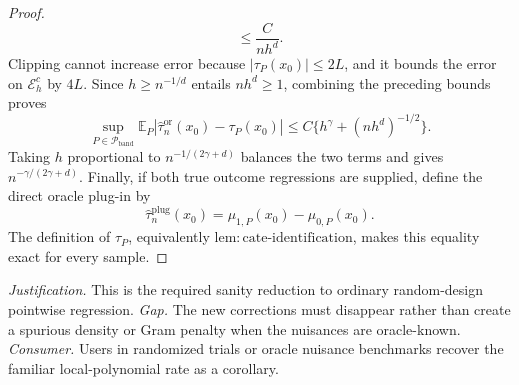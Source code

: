 \documentclass{article}
\begin{document}
\begin{proof}
\[ \le\frac{C}{nh^d}.
\]
Clipping cannot increase error because \(|\tau_P(x_0)|\le2L\), and it bounds the error on \(\mathcal E_h^c\) by \(4L\).  Since \(h\ge n^{-1/d}\) entails \(nh^d\ge1\), combining the preceding bounds proves
\[
 \sup_{P\in\mathcal P_{\mathrm{band}}}
 \mathbb E_P|\widehat\tau_n^{\mathrm{or}}(x_0)-\tau_P(x_0)|
 \le C\{h^\gamma+(nh^d)^{-1/2}\}.
\]
Taking \(h\) proportional to \(n^{-1/(2\gamma+d)}\) balances the two terms and gives \(n^{-\gamma/(2\gamma+d)}\).  Finally, if both true outcome regressions are supplied, define the direct oracle plug-in by
\[
 \widehat\tau_n^{\mathrm{plug}}(x_0)
 =\mu_{1,P}(x_0)-\mu_{0,P}(x_0).
\]
The definition of \(\tau_P\), equivalently \(\mathrm{lem:cate\mbox{-}identification}\), makes this equality exact for every sample.
\end{proof}
\par\smallskip\noindent \textit{Justification.} This is the required sanity reduction to ordinary random-design pointwise regression. \textit{Gap.} The new corrections must disappear rather than create a spurious density or Gram penalty when the nuisances are oracle-known. \textit{Consumer.} Users in randomized trials or oracle nuisance benchmarks recover the familiar local-polynomial rate as a corollary.
\end{document}
